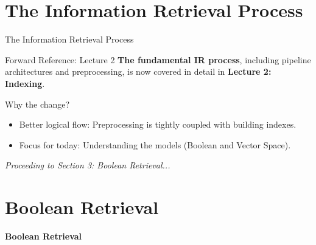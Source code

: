 \documentclass[aspectratio=169]{beamer}
\begin{document}
\section{The Information Retrieval Process}
\begin{frame}{The Information Retrieval Process}
\begin{alertblock}{Forward Reference: Lecture 2}
\textbf{The fundamental IR process}, including pipeline architectures and preprocessing, is now covered in detail in \textbf{Lecture 2: Indexing}.
\end{alertblock}

\vspace{1em}
\begin{exampleblock}{Why the change?}
\begin{itemize}
    \item Better logical flow: Preprocessing is tightly coupled with building indexes.
    \item Focus for today: Understanding the models (Boolean and Vector Space).
\end{itemize}
\end{exampleblock}

\vspace{1em}
\begin{center}
\textit{Proceeding to Section 3: Boolean Retrieval...}
\end{center}
\end{frame}

\section{Boolean Retrieval}
\begin{frame}
  \centering
  \LARGE \textbf{Boolean Retrieval}
\end{frame}
\end{document}

